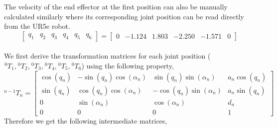The velocity of the end effector at the first position can also be manually calculated similarly where its corresponding joint position can be read directly from the UR5e robot.
\begin{equation*}
    \begin{bmatrix} q_1&q_2&q_3&q_4&q_5&q_6 \end{bmatrix} = \begin{bmatrix}0 & -1.124& 1.803 & -2.250 & -1.571 & 0 \end{bmatrix}
\end{equation*}
\\We first derive the transformation matrices for each joint position ($\hspace{1pt} ^{0}T_{1} ,\hspace{1pt} ^{0}T_{2},\hspace{1pt} ^{0}T_{3},\hspace{1pt} ^{0}T_{4},\hspace{1pt} ^{0}T_{5},\hspace{1pt} ^{0}T_{6}$) using the following property,
\begin{equation*}
    ^{n-1}T_{n}  = \begin{bmatrix}
        \cos(q_n) & -\sin(q_n)\cos(\alpha_n) & \sin(q_n)\sin(\alpha_n)  & a_n \cos(q_n) \\
        \sin(q_n) & \cos(q_n)\cos(\alpha_n)  & -\cos(q_n)\sin(\alpha_n) & a_n \sin(q_n) \\
        0         & \sin(\alpha_n)           & \cos(\alpha_n)           & d_n           \\
        0         & 0                        & 0                        & 1
    \end{bmatrix}
\end{equation*}
Therefore we get the following intermediate matrices,
